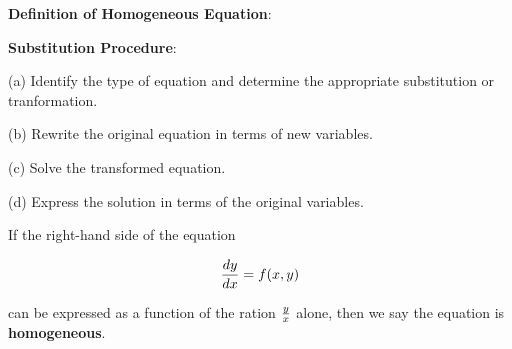 \nopagenumbers
{\bf Definition of Homogeneous Equation}:

\vskip 6pt 

{\bf Substitution Procedure}: 

\vskip 6pt
(a) Identify the type of equation and determine the appropriate substitution or tranformation.

\vskip 6pt
(b) Rewrite the original equation in terms of new variables.

\vskip 6pt
(c) Solve the transformed equation.

\vskip 6pt
(d) Express the solution in terms of the original variables.

\vskip 6pt
If the right-hand side of the equation

$${dy\over dx}=f(x,y)$$

can be expressed as a function of the ration ${y\over x}$ alone, then we say the equation is {\bf homogeneous}.

\vfill\eject
\bye
